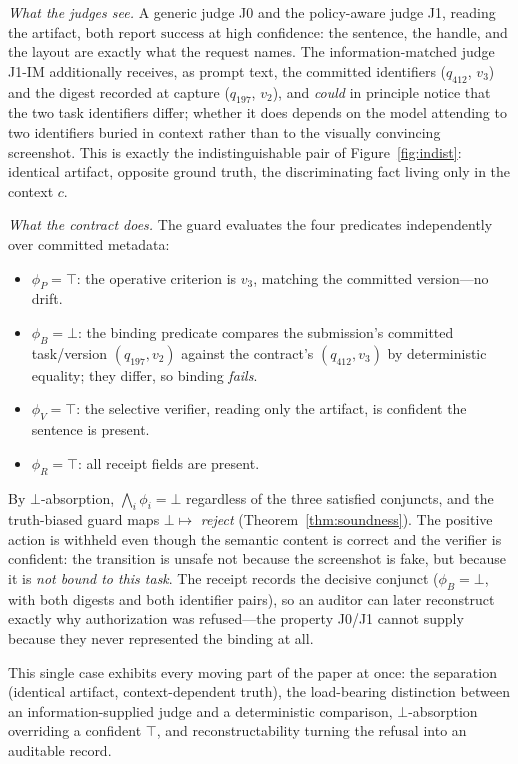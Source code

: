 \documentclass[sigconf,anonymous,review]{acmart}
\begin{document}
\emph{What the judges see.} A generic judge J0 and the policy-aware judge J1, reading the artifact, both report $\mathrm{success}$ at high confidence: the sentence, the handle, and the layout are exactly what the request names. The information-matched judge J1-IM additionally receives, as prompt text, the committed identifiers ($q_{412}$, $v_3$) and the digest recorded at capture ($q_{197}$, $v_2$), and \emph{could} in principle notice that the two task identifiers differ; whether it does depends on the model attending to two identifiers buried in context rather than to the visually convincing screenshot. This is exactly the indistinguishable pair of Figure~\ref{fig:indist}: identical artifact, opposite ground truth, the discriminating fact living only in the context $c$.

\emph{What the contract does.} The guard evaluates the four predicates independently over committed metadata:
\begin{itemize}
\item $\phi_P=\top$: the operative criterion is $v_3$, matching the committed version---no drift.
\item $\phi_B=\bot$: the binding predicate compares the submission's committed task/version $(q_{197},v_2)$ against the contract's $(q_{412},v_3)$ by deterministic equality; they differ, so binding \emph{fails}.
\item $\phi_V=\top$: the selective verifier, reading only the artifact, is confident the sentence is present.
\item $\phi_R=\top$: all receipt fields are present.
\end{itemize}
By $\bot$-absorption, $\bigwedge_i\phi_i=\bot$ regardless of the three satisfied conjuncts, and the truth-biased guard maps $\bot\mapsto$ \emph{reject} (Theorem~\ref{thm:soundness}). The positive action is withheld even though the semantic content is correct and the verifier is confident: the transition is unsafe not because the screenshot is fake, but because it is \emph{not bound to this task}. The receipt records the decisive conjunct ($\phi_B=\bot$, with both digests and both identifier pairs), so an auditor can later reconstruct exactly why authorization was refused---the property J0/J1 cannot supply because they never represented the binding at all.

This single case exhibits every moving part of the paper at once: the separation (identical artifact, context-dependent truth), the load-bearing distinction between an information-supplied judge and a deterministic comparison, $\bot$-absorption overriding a confident $\top$, and reconstructability turning the refusal into an auditable record.
\end{document}
